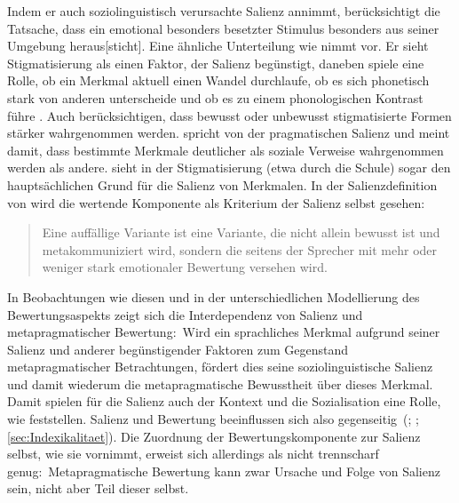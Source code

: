 Indem er auch soziolinguistisch verursachte Salienz annimmt, berücksichtigt \citet[10]{Auer2014} die Tatsache, dass \glqq ein emotional besonders besetzter Stimulus besonders aus seiner Umgebung heraus[sticht]\grqq.
Eine ähnliche Unterteilung wie \citet{Auer2014} nimmt \citet[11]{Trudgill1986} vor. 
Er sieht Stigmatisierung als einen Faktor, der Salienz begünstigt, daneben spiele eine Rolle, ob ein Merkmal aktuell einen Wandel durchlaufe, ob es sich phonetisch stark von anderen unterscheide und ob es zu einem phonologischen Kontrast führe \citep[s.][11]{Trudgill1986}. 
Auch \citet[121]{Elmentaler2010} berücksichtigen, dass bewusst oder unbewusst stigmatisierte Formen stärker wahrgenommen werden.
\citet[294--295]{Errington.1985} spricht von der pragmatischen Salienz und meint damit, dass bestimmte Merkmale deutlicher als soziale Verweise wahrgenommen werden als andere. 
\citet[184]{Mihm.1985} sieht in der Stigmatisierung (etwa durch die Schule) sogar den haupts{\"a}chlichen Grund f{\"u}r die Salienz von Merkmalen. 
In der Salienzdefinition von \citet[]{Lenz2010} wird die wertende Komponente als Kriterium der Salienz selbst gesehen: 
\begin{quote}Eine auffällige Variante ist eine Variante, die nicht allein bewusst ist und metakommuniziert wird, sondern die seitens der Sprecher mit mehr oder weniger stark emotionaler Bewertung versehen wird. \citep[200]{Lenz2010}\end{quote}
In Beobachtungen wie diesen und in der unterschiedlichen Modellierung des Bewertungsaspekts zeigt sich die Interdependenz von Salienz und metapragmatischer Bewertung:~Wird ein sprachliches Merkmal aufgrund seiner Salienz und anderer begünstigender Faktoren zum Gegenstand metapragmatischer Betrachtungen, fördert dies seine soziolinguistische Salienz und damit wiederum die metapragmatische Bewusstheit über dieses Merkmal. 
Damit spielen für die Salienz auch der Kontext und die Sozialisation eine Rolle, wie \citet[135]{Elmentaler2010} feststellen. 
Salienz und Bewertung beeinflussen sich also gegenseitig~(\citealp[s.][58]{Hickey2000}; \citealp[163f]{Hettler.2013}; \autoref{sec:Indexikalitaet}).  
Die Zuordnung der Bewertungskomponente zur Salienz selbst, wie \citet{Lenz.2003} sie vornimmt, erweist sich allerdings als nicht trennscharf genug:~Metapragmatische Bewertung kann zwar Ursache und Folge von Salienz sein, nicht aber Teil dieser selbst. 

